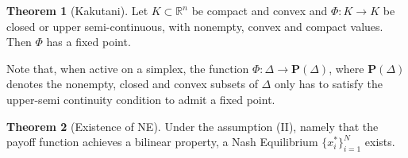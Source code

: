 \documentclass{article}
\theoremstyle{definition}
\newtheorem{theorem}{Theorem}
\begin{document}
	\begin{theorem}[Kakutani]
		Let $K \subset \mathbb{R}^n$ be compact and convex and $\Phi: K \rightarrow K$ be closed or upper semi-continuous, with nonempty, convex and compact values. Then $\Phi$ has a fixed point.
	\end{theorem}

	Note that, when active on a simplex, the function $\Phi: \Delta \rightarrow \textbf{P}(\Delta)$, where $\textbf{P}(\Delta)$ denotes the nonempty, closed and convex subsets of $\Delta$ only has to satisfy the upper-semi continuity condition to admit a fixed point.

	\begin{theorem}[Existence of NE]
		Under the assumption (II), namely that the payoff function achieves a bilinear property, a Nash Equilibrium $\{x_i^*\}_{i = 1}^N$ exists.
	\end{theorem}
\end{document}
